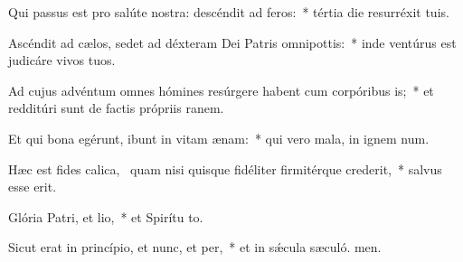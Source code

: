 \item Qui passus est pro salúte nostra: descéndit ad feros:~* tértia die resurréxit  tuis.
\item Ascéndit ad cælos, sedet ad déxteram Dei Patris omnipottis:~* inde ventúrus est judicáre vivos  tuos.
\item Ad cujus advéntum omnes hómines resúrgere habent cum corpóribus is;~* et redditúri sunt de factis própriis ranem.
\item Et qui bona egérunt, ibunt in vitam ænam:~* qui vero mala, in ignem num.
\item Hæc est fides calica,~\pscross{} quam nisi quisque fidéliter firmitérque crederit,~* salvus esse  erit.
\item Glória Patri, et lio,~* et Spirítu to.
\item Sicut erat in princípio, et nunc, et per,~* et in sǽcula sæculó. men.
